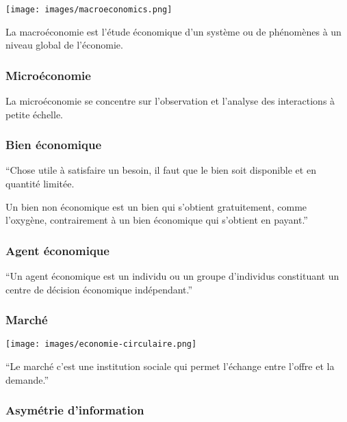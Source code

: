 \documentclass[
  letterpaper,
  DIV=11,
  numbers=noendperiod]{scrartcl}
\begin{document}
\begin{center}
\texttt{[image: images/macroeconomics.png]}
\end{center}

La macroéconomie est l'étude économique d'un système ou de phénomènes à
un niveau global de l'économie.

\subsubsection{Microéconomie}\label{microuxe9conomie}

La microéconomie se concentre sur l'observation et l'analyse des
interactions à petite échelle.

\subsubsection{Bien économique}\label{bien-uxe9conomique}

``Chose utile à satisfaire un besoin, il faut que le bien soit
disponible et en quantité limitée.

Un bien non économique est un bien qui s'obtient gratuitement, comme
l'oxygène, contrairement à un bien économique qui s'obtient en payant.''

\subsubsection{Agent économique}\label{agent-uxe9conomique}

``Un agent économique est un individu ou un groupe d'individus
constituant un centre de décision économique indépendant.''

\subsubsection{Marché}\label{marchuxe9}

\begin{center}
\texttt{[image: images/economie-circulaire.png]}
\end{center}

``Le marché c'est une institution sociale qui permet l'échange entre
l'offre et la demande.''

\subsubsection{Asymétrie d'information}\label{asymuxe9trie-dinformation}
\end{document}

